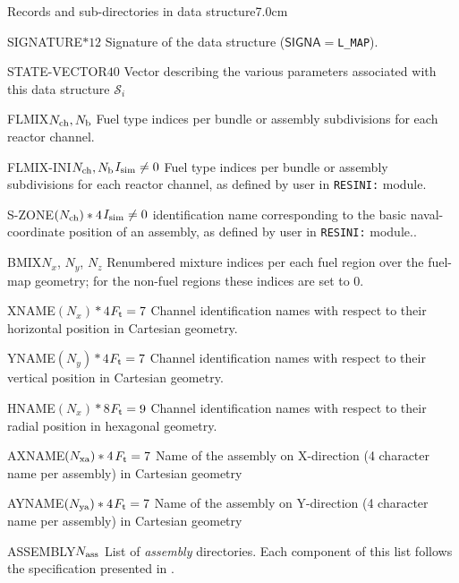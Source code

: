 \begin{DescriptionEnregistrement}{Records and sub-directories
 in  data structure}{7.0cm} \label{tabl:tabfmap}

\CharEnr
 {SIGNATURE}{$*12$}
 {Signature of the  data structure ($\mathsf{SIGNA}=${\tt L\_MAP}).}

\IntEnr
  {STATE-VECTOR}{$40$}
  {Vector describing the various parameters associated with this data structure
  $\mathcal{S}_i$}

\IntEnr
 {FLMIX}{$N_{\rm ch}, N_{\rm b}$}
 {Fuel type indices per bundle or assembly subdivisions for each reactor channel.}

\OptIntEnr
 {FLMIX-INI}{$N_{\rm ch}, N_{\rm b}$}{$I_{\rm sim}\ne 0$}
 {Fuel type indices per bundle or assembly subdivisions for each reactor channel, as defined by user
 in {\tt RESINI:} module.}

\OptCharEnr
 {S-ZONE}{$(N_{\rm ch})*4$}{$I_{\rm sim}\ne 0$}
 {identification name corresponding to the basic naval-coordinate position of an assembly, as defined by user
 in {\tt RESINI:} module..}

\IntEnr
 {BMIX}{$N_x$, $N_y$, $N_z$}
 {Renumbered mixture indices per each fuel region over the fuel-map
  geometry; for the non-fuel regions these indices are set to 0.}

\OptCharEnr
 {XNAME}{$(N_x)*4$}{$F_{\rm t}=7$}
 {Channel identification names with respect to their horizontal position in Cartesian geometry.}

\OptCharEnr
 {YNAME}{$(N_y)*4$}{$F_{\rm t}=7$}
 {Channel identification names with respect to their vertical position in Cartesian geometry.}

\OptCharEnr
 {HNAME}{$(N_x)*8$}{$F_{\rm t}=9$}
 {Channel identification names with respect to their radial position in hexagonal geometry.}

\OptCharEnr
 {AXNAME}{$(N_{\rm xa})*4$}{$F_{\rm t}=7$}
 {Name of the assembly on X-direction (4 character name per assembly) in Cartesian geometry}

\OptCharEnr
 {AYNAME}{$(N_{\rm ya})*4$}{$F_{\rm t}=7$}
 {Name of the assembly on Y-direction (4 character name per assembly) in Cartesian geometry}

\OptDirlEnr
 {ASSEMBLY}{$N_{\rm ass}$}{}
 {List of {\sl assembly} directories. Each component of this list follows the specification
  presented in .}


\end{DescriptionEnregistrement}
